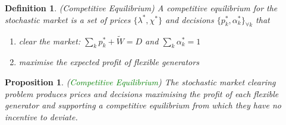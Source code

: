 \documentclass{article}
\newtheorem{proposition}{Proposition}
\newtheorem{definition}{Definition}
\begin{document}
\begin{definition}
(Competitive Equilibrium) A competitive equilibrium for the stochastic market is a set of prices $\{\lambda^*, \chi^*\}$ and decisions $\{p_k^*, \alpha_k^*\}_{\forall k}$ that\vspace{-5pt}
\begin{enumerate}
\item clear the market: $\sum_k p_k^* + \tilde{W} = D$ and $\sum_k \alpha_k^* = 1$\vspace{-5pt}
\item maximise the expected profit of flexible generators
\end{enumerate}
\end{definition}

\begin{proposition}
(\textcolor{green}{Competitive Equilibrium}) The stochastic market clearing problem produces prices and decisions maximising the profit of each flexible generator and supporting a competitive equilibrium from which they have no incentive to deviate.
\end{proposition}
\end{document}
